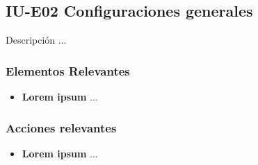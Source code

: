 
\subsection{IU-E02 Configuraciones generales}

 Descripción ...


\subsubsection{Elementos Relevantes}

    \begin{itemize}
    \item {\bf Lorem ipsum}
        ...
    \end{itemize}

\subsubsection{Acciones relevantes}

    \begin{itemize}
    \item {\bf Lorem ipsum}
        ...
    \end{itemize}

\clearpage
